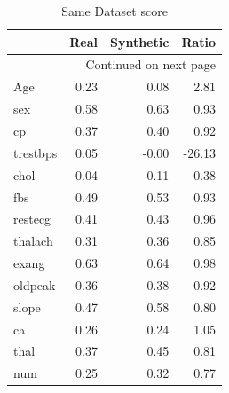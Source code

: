 \documentclass{article}
\begin{document}
\begin{longtable}{lrrr}
\caption{Same Dataset score}\label{tab:samedatascore}\\
\toprule
{} &  Real &  Synthetic &  Ratio \\
\midrule
\endhead
\midrule
\multicolumn{4}{r}{{Continued on next page}} \\
\midrule
\endfoot

\bottomrule
\endlastfoot
Age      &  0.23 &       0.08 &   2.81 \\
sex      &  0.58 &       0.63 &   0.93 \\
cp       &  0.37 &       0.40 &   0.92 \\
trestbps &  0.05 &      -0.00 & -26.13 \\
chol     &  0.04 &      -0.11 &  -0.38 \\
fbs      &  0.49 &       0.53 &   0.93 \\
restecg  &  0.41 &       0.43 &   0.96 \\
thalach  &  0.31 &       0.36 &   0.85 \\
exang    &  0.63 &       0.64 &   0.98 \\
oldpeak  &  0.36 &       0.38 &   0.92 \\
slope    &  0.47 &       0.58 &   0.80 \\
ca       &  0.26 &       0.24 &   1.05 \\
thal     &  0.37 &       0.45 &   0.81 \\
num      &  0.25 &       0.32 &   0.77 \\
\end{longtable}
\end{document}
